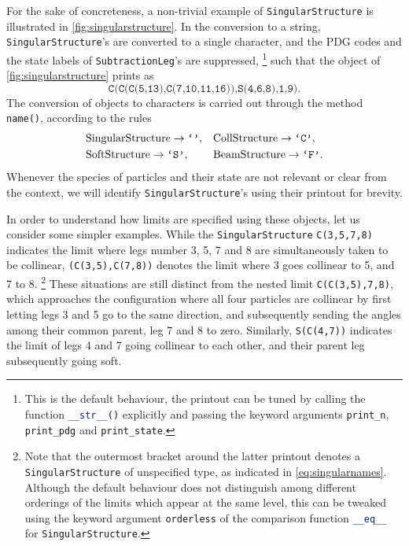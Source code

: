 \documentclass[11pt,a4paper]{article}
\newcommand{\py}[1]{\lstinline[language=python]{#1}}
\begin{document}
For the sake of concreteness,
a non-trivial example of \py{SingularStructure}
is illustrated in \cref{fig:singularstructure}.
In the conversion to a string,
\py{SingularStructure}'s are converted to a single character,
and the PDG codes and the state labels
of \py{SubtractionLeg}'s are suppressed,%
\footnote{
This is the default behaviour,
the printout can be tuned by calling the function
\py{__str__()} explicitly
and passing the keyword arguments
\py{print_n}, \py{print_pdg} and \py{print_state}.
}
such that the object of \cref{fig:singularstructure} prints as
\begin{equation}
	\texttt{C(C(C(5,13),C(7,10,11,16)),S(4,6,8),1,9)}.
\end{equation}
The conversion of objects to characters is carried out
through the method \py{name()}, according to the rules
\begin{equation}
\label{eq:singularnames}
\begin{aligned}
	&\text{\py{SingularStructure}} \to \texttt{`'}, &
	&\text{\py{CollStructure}} \to \texttt{`C'}, \\
	&\text{\py{SoftStructure}} \to \texttt{`S'}, &
	&\text{\py{BeamStructure}} \to \texttt{`F'}.
\end{aligned}
\end{equation}
Whenever the species of particles and their state are not relevant
or clear from the context, we will identify \py{SingularStructure}'s
using their printout for brevity.

In order to understand how limits are specified using these objects,
let us consider some simpler examples.
While the \py{SingularStructure} \texttt{C(3,5,7,8)}
indicates the limit where legs number 3, 5, 7 and 8
are simultaneously taken to be collinear,
\texttt{(C(3,5),C(7,8))} denotes the limit
where 3 goes collinear to 5, and 7 to 8.%
\footnote{
Note that the outermost bracket around the latter printout
denotes a \py{SingularStructure} of unspecified type,
as indicated in \cref{eq:singularnames}.
Although the default behaviour does not distinguish among
different orderings of the limits which appear at the same level,
this can be tweaked using the keyword argument \py{orderless}
of the comparison function \py{__eq__} for \py{SingularStructure}.
}
These situations are still distinct from the nested limit
\texttt{C(C(3,5),7,8)}, which approaches the configuration
where all four particles are collinear
by first letting legs 3 and 5 go to the same direction,
and subsequently sending the angles among their common parent,
leg 7 and 8 to zero.
Similarly, \texttt{S(C(4,7))} indicates the limit
of legs 4 and 7 going collinear to each other,
and their parent leg subsequently going soft.
\end{document}
